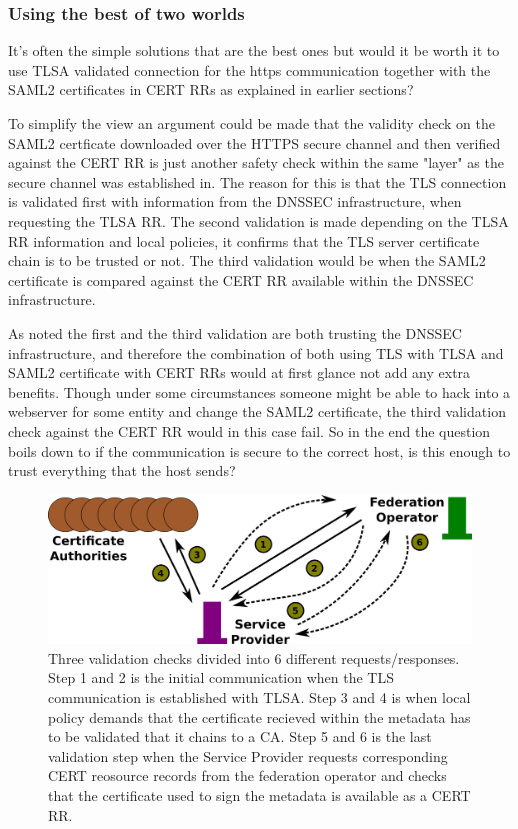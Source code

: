 \subsubsection{Using the best of two worlds}
It's often the simple solutions that are the best ones but would it be worth it to use TLSA validated connection for the https communication together with the SAML2 certificates in CERT RRs as explained in earlier sections?

To simplify the view an argument could be made that the validity check on the SAML2 certficate downloaded over the HTTPS secure channel and then verified against the CERT RR is just another safety check within the same "layer" as the secure channel was established in.
The reason for this is that the TLS connection is validated first with information from the DNSSEC infrastructure, when requesting the TLSA RR.
The second validation is made depending on the TLSA RR information and local policies, it confirms that the TLS server certificate chain is to be trusted or not.
The third validation would be when the SAML2 certificate is compared against the CERT RR available within the DNSSEC infrastructure.

As noted the first and the third validation are both trusting the DNSSEC infrastructure, and therefore the combination of both using TLS with TLSA and SAML2 certificate with CERT RRs would at first glance not add any extra benefits.
Though under some circumstances someone might be able to hack into a webserver for some entity and change the SAML2 certificate, the third validation check against the CERT RR would in this case fail.
So in the end the question boils down to if the communication is secure to the correct host, is this enough to trust everything that the host sends?

\begin{figure}[ht]
\begin{center}
\includegraphics[scale=1]{Figures/bestOfTwoWorlds.png}
\end{center}
\caption{Three validation checks divided into 6 different requests/responses.
Step 1 and 2 is the initial communication when the TLS communication is established with TLSA.
Step 3 and 4 is when local policy demands that the certificate recieved within the metadata has to be validated that it chains to a CA.
Step 5 and 6 is the last validation step when the Service Provider requests corresponding CERT reosource records from the federation operator and checks that the certificate used to sign the metadata is available as a CERT RR.
\label{ch4:bestOfTwoWorlds}}
\end{figure}

